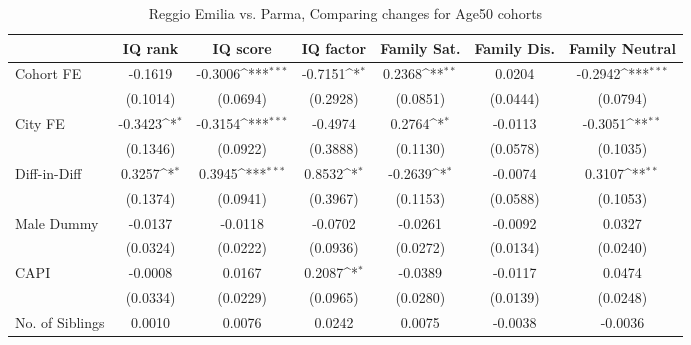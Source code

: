 \begin{table}[htbp]\centering
\def\sym#1{\ifmmode^{#1}\else\(^{#1}\)\fi}
\caption{Reggio Emilia vs. Parma, Comparing changes for Age50 cohorts}
\begin{tabular}{l*{6}{c}}
\toprule
            &\multicolumn{1}{c}{IQ rank}&\multicolumn{1}{c}{IQ score}&\multicolumn{1}{c}{IQ factor}&\multicolumn{1}{c}{Family Sat.}&\multicolumn{1}{c}{Family Dis.}&\multicolumn{1}{c}{Family Neutral}\\
\midrule
Cohort FE   &     -0.1619         &     -0.3006\sym{***}&     -0.7151\sym{*}  &      0.2368\sym{**} &      0.0204         &     -0.2942\sym{***}\\
            &    (0.1014)         &    (0.0694)         &    (0.2928)         &    (0.0851)         &    (0.0444)         &    (0.0794)         \\
\addlinespace
City FE     &     -0.3423\sym{*}  &     -0.3154\sym{***}&     -0.4974         &      0.2764\sym{*}  &     -0.0113         &     -0.3051\sym{**} \\
            &    (0.1346)         &    (0.0922)         &    (0.3888)         &    (0.1130)         &    (0.0578)         &    (0.1035)         \\
\addlinespace
Diff-in-Diff&      0.3257\sym{*}  &      0.3945\sym{***}&      0.8532\sym{*}  &     -0.2639\sym{*}  &     -0.0074         &      0.3107\sym{**} \\
            &    (0.1374)         &    (0.0941)         &    (0.3967)         &    (0.1153)         &    (0.0588)         &    (0.1053)         \\
\addlinespace
Male Dummy  &     -0.0137         &     -0.0118         &     -0.0702         &     -0.0261         &     -0.0092         &      0.0327         \\
            &    (0.0324)         &    (0.0222)         &    (0.0936)         &    (0.0272)         &    (0.0134)         &    (0.0240)         \\
\addlinespace
CAPI        &     -0.0008         &      0.0167         &      0.2087\sym{*}  &     -0.0389         &     -0.0117         &      0.0474         \\
            &    (0.0334)         &    (0.0229)         &    (0.0965)         &    (0.0280)         &    (0.0139)         &    (0.0248)         \\
\addlinespace
No. of Siblings&      0.0010         &      0.0076         &      0.0242         &      0.0075         &     -0.0038         &     -0.0036         \\

\end{tabular}
\end{table}
